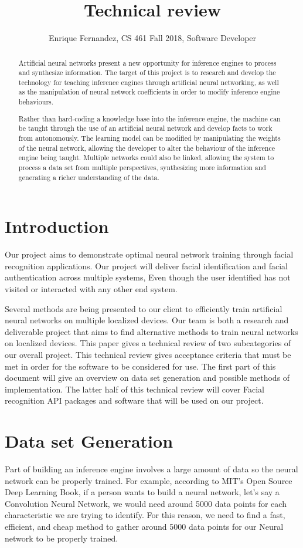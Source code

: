 \documentclass[onecolumn, draftclsnofoot,10pt, compsoc]{IEEEtran}
\title{Technical review}
\author{Enrique Fernandez, CS 461 Fall 2018, Software Developer}
\begin{document}
\maketitle
    \begin{abstract}
    Artificial neural networks present a new opportunity for inference engines to process and synthesize information. The target of this project is to research and develop the technology for teaching inference engines through artificial neural networking, as well as the manipulation of neural network coefficients in order to modify inference engine behaviours.
    
    Rather than hard-coding a knowledge base into the inference engine, the machine can be taught through the use of an artificial neural network and develop facts to work from autonomously. The learning model can be modified by manipulating the weights of the neural network, allowing the developer to alter the behaviour of the inference engine being taught. Multiple networks could also be linked, allowing the system to process a data set from multiple perspectives, synthesizing more information and generating a richer understanding of the data.
    \end{abstract}
    
    \section{Introduction}
    Our project aims to demonstrate optimal neural network training through facial recognition applications. Our project will deliver facial identification and facial authentication across multiple systems, Even though the user identified has not visited or interacted with any other end system.

    Several methods are being presented to our client to efficiently train artificial neural networks on multiple localized devices. Our team is both a research and deliverable project that aims to find alternative methods to train neural networks on localized devices. This paper gives a technical review of two subcategories of our overall project. This technical review gives acceptance criteria that must be met in order for the software to be considered for use. The first part of this document will give an overview on data set generation and possible methods of implementation. The latter half of this technical review will cover Facial recognition API packages and software that will be used on our project.

    \section{Data set Generation}
    Part of building an inference engine involves a large amount of data so the neural network can be properly trained. For example, according to MIT’s Open Source Deep Learning Book, if a person wants to build a neural network, let’s say a Convolution Neural Network, we would need around 5000 data points for each characteristic we are trying to identify. For this reason, we need to find a fast, efficient, and cheap method to gather around 5000 data points for our Neural network to be properly trained. 
    
\end{document}
